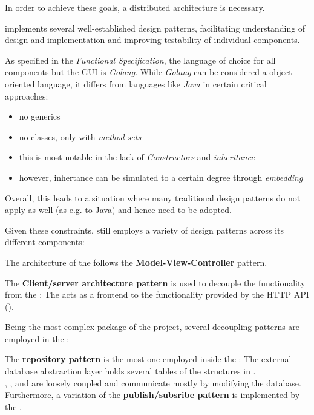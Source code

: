 In order to achieve these goals, a distributed architecture is necessary.

\mamid implements several well-established design patterns, facilitating understanding of design and implementation and improving
testability of individual components.

As specified in the \emph{Functional Specification}, the language of choice for all components but the GUI is \emph{Golang}.
While \emph{Golang} can be considered a object-oriented language, it differs from languages like \emph{Java} in certain critical approaches:
\begin{itemize}
  \item no generics
  \item no classes, only  with \emph{method sets}
  \item this is most notable in the lack of \emph{Constructors} and \emph{inheritance}
  \item however, inhertance can be simulated to a certain degree through \emph{embedding} %
\end{itemize}

Overall, this leads to a situation where many traditional design patterns do not apply as well (as e.g. to Java) and hence need
to be adopted.

Given these constraints, \mamid still employs a variety of design patterns across its different components:

The architecture of the  follows the \textbf{Model-View-Controller} pattern.

The \textbf{Client/server architecture pattern} is used to decouple the  functionality from the :
The  acts as a frontend to the functionality provided by the  HTTP API ().

Being the most complex package of the project, several decoupling patterns are employed in the :

The \textbf{repository pattern} is the most one employed inside the :
The external  database abstraction layer holds several tables of the structures in .\\
,  ,
 and   are loosely coupled and communicate mostly by
modifying the database.\\
Furthermore, a variation of the \textbf{publish/subsribe pattern} is implemented by the .

